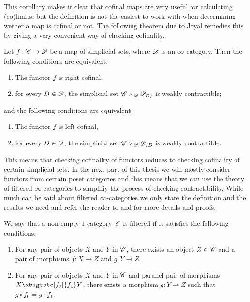 \documentclass[../../thesis.tex]{subfiles}
\begin{document}
This corollary makes it clear that cofinal maps are very useful for calculating (co)limits, but the definition is not the easiest to work with when determining wether a map is cofinal or not.
The following theorem due to Joyal remedies this by giving a very convenient way of checking cofinality.
\begin{theorem}{\cite[\href{https://kerodon.net/tag/02NY}{Theorem 02NY}]{kerodon}\label{superlemma}}
    Let \(f\colon \mathscr{C} \to \mathscr{D}\) be a map of simplicial sets, where $\mathscr{D}$ is an $\infty$-category.
    Then the following conditions are equivalent:
    \begin{enumerate}
        \item The functor $f$ is right cofinal,
        \item for every $D\in \mathscr{D}$, the simplicial set $\mathscr{C}\times_{\mathscr{D}} \mathscr{D}_{D/}$ is weakly contractible;
    \end{enumerate}
    and the following conditions are equivalent:
    \begin{enumerate}
        \item The functor $f$ is left cofinal,
        \item for every $D\in \mathscr{D}$, the simplicial set $\mathscr{C}\times_{\mathscr{D}} \mathscr{D}_{/D}$ is weakly contractible.
    \end{enumerate}
\end{theorem}
This means that checking cofinality of functors reduces to checking cofinality of certain simplicial sets.
In the next part of this thesis we will mostly consider functors from certain poset categories and this means that we can use the theory of filtered $\infty$-categories to simplifiy the process of checking contractibility.
While much can be said about filtered $\infty$-categories we only state the definition and the results we need and refer the reader to \cite[\href{https://kerodon.net/tag/02P8}{Subsection 02P8}]{kerodon} and \cite[Section 5.3.1]{HTT} for more details and proofs.
\begin{definition}
    We say that a non-empty $1$-category $\mathscr{C}$ is filtered if it satisfies the following conditions:
    \begin{enumerate}
        \item For any pair of objects $X$ and $Y$ in $\mathscr{C}$, there exists an object $Z \in \mathscr{C}$ and a pair of morphisms $f \colon X\to Z$ and $g \colon Y\to Z$.
        \item For any pair of objects $X$ and $Y$ in $\mathscr{C}$ and parallel pair of morphisms $X \xbigtoto[f_0]{f_1} Y$, there exists a morphism $g \colon Y \to Z$ such that $g \circ f_0 = g \circ f_1$.
    \end{enumerate}
\end{definition}
\end{document}
